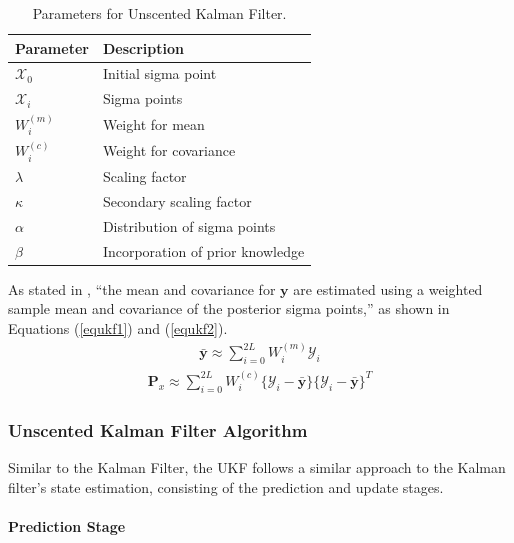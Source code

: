 \begin{table}[H]
    \centering
    \large
    \caption{Parameters for Unscented Kalman Filter.}
    \label{tab:ukf_parameters}
    \begin{tabular}{ll}
        \toprule
        Parameter & Description \\
        \midrule
        \( \mathcal{X}_0 \) & Initial sigma point \\
        \( \mathcal{X}_i \) & Sigma points \\
        \( W^{(m)}_i \) & Weight for mean \\
        \( W^{(c)}_i \) & Weight for covariance \\
        \( \lambda \) & Scaling factor \\
        \( \kappa \) & Secondary scaling factor \\
        \( \alpha \) & Distribution of sigma points \\
        \( \beta \) & Incorporation of prior knowledge \\
        \bottomrule
    \end{tabular}
\end{table}
\noindent As stated in \cite{Julier1997a}, ``the mean and covariance for \( \mathbf{y} \) are estimated using a weighted sample mean and covariance of the posterior sigma points,'' as shown in Equations (\ref{equkf1}) and (\ref{equkf2}).  
\begin{equation}
    \begin{aligned}
        \bar{\mathbf{y}} \approx \sum_{i=0}^{2L} W^{(m)}_i \mathcal{Y}_i
    \end{aligned}
    \label{equkf1}
\end{equation}
\begin{equation}
    \begin{aligned}
        \mathbf{P}_x \approx \sum_{i=0}^{2L} W^{(c)}_i \{\mathcal{Y}_i-\bar{\mathbf{y}}\}\{\mathcal{Y}_i-\bar{\mathbf{y}}\}^T
    \end{aligned}
    \label{equkf2}
\end{equation}
\subsubsection{Unscented Kalman Filter Algorithm}
Similar to the Kalman Filter, the \ac{UKF} follows a similar approach to the Kalman filter's state estimation, consisting of the prediction and update stages.

\paragraph{Prediction Stage}\mbox{}

